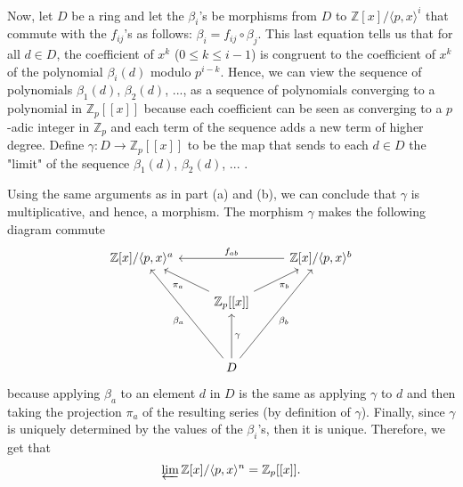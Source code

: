 \documentclass{article}
\newcommand{\Z}{\mathbb{Z}}
\begin{document}
\begin{enumerate}[label=(\alph*)]
    Now, let $D$ be a ring and let the $\beta_i$'s be morphisms from $D$ to $\Z[x]/\langle p,x \rangle^i$ that commute with the $f_{ij}$'s as follows: $\beta_i = f_{ij} \circ \beta_j$. This last equation tells us that for all $d \in D$, the coefficient of $x^k$ ($0 \leq k \leq i-1$) is congruent to the coefficient of $x^k$ of the polynomial $\beta_i(d)$ modulo $p^{i-k}$. Hence, we can view the sequence of polynomials $\beta_1(d)$, $\beta_2(d)$, ..., as a sequence of polynomials converging to a polynomial in $\Z_p[[x]]$ because each coefficient can be seen as converging to a $p$-adic integer in $\Z_p$ and each term of the sequence adds a new term of higher degree. Define $\gamma : D \to \Z_p[[x]]$ to be the map that sends to each $d \in D$ the "limit" of the sequence $\beta_1(d)$, $\beta_2(d)$, ... .
    
    Using the same arguments as in part (a) and (b), we can conclude that $\gamma$ is multiplicative, and hence, a morphism. The morphism $\gamma$ makes the following diagram commute 
    \[\begin{tikzcd}
	{\Z[x]/\langle p,x \rangle^a} && {\Z[x]/\langle p,x \rangle^b} \\
	& {\Z_p[[x]]} \\
	\\
	& D
	\arrow["{f_{ab}}"', from=1-3, to=1-1]
	\arrow["{\pi_a}", from=2-2, to=1-1]
	\arrow["{\pi_b}"', from=2-2, to=1-3]
	\arrow["{\beta_a}", from=4-2, to=1-1]
	\arrow["{\beta_b}"', from=4-2, to=1-3]
	\arrow["\gamma"', from=4-2, to=2-2]
    \end{tikzcd}\]
    because applying $\beta_a$ to an element $d$ in $D$ is the same as applying $\gamma$ to $d$ and then taking the projection $\pi_a$ of the resulting series (by definition of $\gamma$). Finally, since $\gamma$ is uniquely determined by the values of the $\beta_i$'s, then it is unique. Therefore, we get that
    $$\varprojlim\Z[x]/\langle p,x \rangle^n = \Z_p[[x]].$$ 
\end{enumerate}

\newpage
\end{document}
